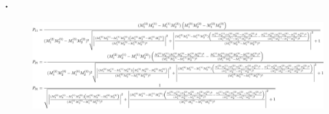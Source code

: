 \documentclass[
  a4paper,uplatex,dvipdfmx,11pt,
  xcolor = {dvipsnames,svgnames},
  hyperref ={colorlinks=true,citecolor=Navy,linkcolor=NavyBlue,urlcolor=purple}
]{beamer}
\begin{document}
\begin{frame}[plain]
  \frametitle{\thesubsection.\ \subsecname}

  \begin{figure}[ht]    
    \centering
    \includegraphics[keepaspectratio,width=1.0\linewidth]{fig/diagonalize_matrix.png}    
  \end{figure}


\end{frame}
\end{document}
